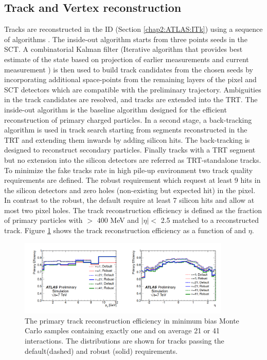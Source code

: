 \subsection{Track and Vertex reconstruction}
\label{chap2:Objects:Trk}
Tracks are reconstructed in the ID (Section \ref{chap2:ATLAS:ITk}) using a sequence of algorithms \cite{Track_Reco, New_Trk}. The inside-out algorithm starts from three points seeds in the SCT.  A combinatorial Kalman filter (Iterative algorithm that provides best estimate of the state based on projection of earlier measurements and current measurement \cite{Kalman} ) is then used to build track candidates from the chosen seeds by incorporating additional space-points from the remaining layers of the pixel and SCT detectors which are compatible with the preliminary trajectory. Ambiguities in the track candidates are resolved, and tracks are extended into the TRT. The inside-out algorithm is the baseline algorithm designed for the efficient reconstruction of primary charged particles. In a second stage, a back-tracking algorithm is used in track search starting from segments reconstructed in the TRT and extending them inwards by adding silicon hits. The back-tracking is designed to reconstruct secondary particles. Finally tracks with a TRT segment but no extension into the silicon detectors are referred as TRT-standalone tracks. To minimize the fake tracks rate in high pile-up environment two track quality requirements are defined. The robust requirement which request at least 9 hits in the silicon detectors and zero holes (non-existing but expected hit) in the pixel. In contrast to the robust, the default require at least 7 silicon hits and allow at most two pixel holes. The track reconstruction efficiency is defined as the fraction of primary particles with \pT $>$ 400 MeV and $|\eta|<$ 2.5 matched to a reconstructed track. Figure \ref{fig:chap2:Objects:Trk:Eff} shows the track reconstruction efficiency as a function of \pT and $\eta$.
\begin{figure}[htbp]
    \centering
    \includegraphics[width=0.9\textwidth]{Ch2/Img/Track_reco_eff.png}
    \caption{The primary track reconstruction efficiency in minimum bias Monte Carlo samples containing exactly one and on average 21 or 41 interactions. The distributions are shown for tracks passing the default(dashed) and robust (solid) requirements.}
    \label{fig:chap2:Objects:Trk:Eff}
\end{figure}
